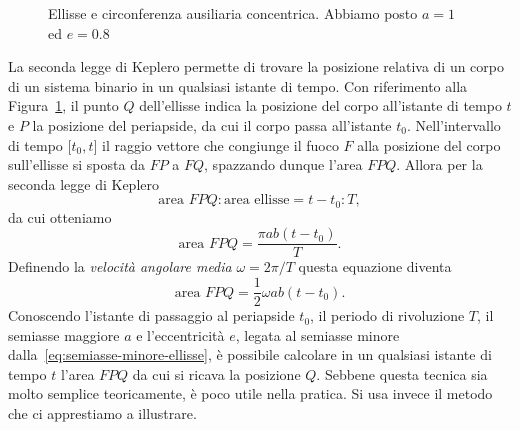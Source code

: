 \begin{figure}
  \centering
  \caption[Ellisse e circonferenza ausiliaria per l'equazione di
  Keplero]{Ellisse e circonferenza ausiliaria concentrica. Abbiamo posto $a=1$
    ed $e=0.8$}
  \label{fig:circonferenza-ausiliaria-keplero}
\end{figure}
La seconda legge di Keplero permette di trovare la posizione relativa di un
corpo di un sistema binario in un qualsiasi istante di tempo. Con riferimento
alla Figura~\ref{fig:circonferenza-ausiliaria-keplero}, il punto $Q$
dell'ellisse indica la posizione del corpo all'istante di tempo $t$ e $P$ la
posizione del periapside, da cui il corpo passa all'istante
$t_0$. Nell'intervallo di tempo $\mathopen{[}t_0, t\mathclose{]}$ il raggio
vettore che congiunge il fuoco $F$ alla posizione del corpo sull'ellisse si
sposta da $FP$ a $FQ$, spazzando dunque l'area $FPQ$. Allora per la seconda
legge di Keplero
\begin{equation}
  \text{area } FPQ : \text{area ellisse} = t-t_0 : T,
\end{equation}
da cui otteniamo
\begin{equation}
  \text{area } FPQ = \frac{\pi ab(t-t_0)}{T}.
\end{equation}
Definendo la \emph{velocità angolare media} $\omega = 2\pi/T$ questa equazione
diventa
\begin{equation}
  \text{area } FPQ = \frac{1}{2}\omega ab(t-t_0).
\end{equation}
Conoscendo l'istante di passaggio al periapside $t_0$, il periodo di rivoluzione
$T$, il semiasse maggiore $a$ e l'eccentricità $e$, legata al semiasse minore
dalla~\eqref{eq:semiasse-minore-ellisse}, è possibile calcolare in un qualsiasi
istante di tempo $t$ l'area $FPQ$ da cui si ricava la posizione $Q$. Sebbene
questa tecnica sia molto semplice teoricamente, è poco utile nella pratica. Si
usa invece il metodo che ci apprestiamo a illustrare.

